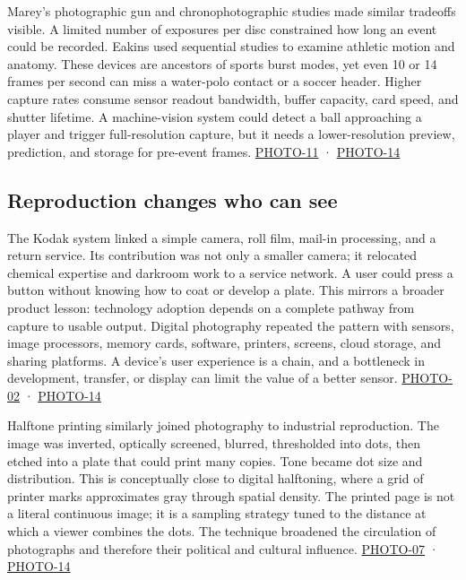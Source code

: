 Marey's photographic gun and chronophotographic studies made similar tradeoffs visible. A limited number of exposures per disc constrained how long an event could be recorded. Eakins used sequential studies to examine athletic motion and anatomy. These devices are ancestors of sports burst modes, yet even 10 or 14 frames per second can miss a water-polo contact or a soccer header. Higher capture rates consume sensor readout bandwidth, buffer capacity, card speed, and shutter lifetime. A machine-vision system could detect a ball approaching a player and trigger full-resolution capture, but it needs a lower-resolution preview, prediction, and storage for pre-event frames. \hyperref[04-visual-computing-ii-ch036-photo-11---photography-session-11]{PHOTO-11} · \hyperref[04-visual-computing-ii-ch036-photo-14---photography-session-14]{PHOTO-14}

\subsection{Reproduction changes who can see}\label{04-visual-computing-ii-ch034-reproduction-changes-who-can-see}

The Kodak system linked a simple camera, roll film, mail-in processing, and a return service. Its contribution was not only a smaller camera; it relocated chemical expertise and darkroom work to a service network. A user could press a button without knowing how to coat or develop a plate. This mirrors a broader product lesson: technology adoption depends on a complete pathway from capture to usable output. Digital photography repeated the pattern with sensors, image processors, memory cards, software, printers, screens, cloud storage, and sharing platforms. A device's user experience is a chain, and a bottleneck in development, transfer, or display can limit the value of a better sensor. \hyperref[04-visual-computing-ii-ch036-photo-02---photography-session-02]{PHOTO-02} · \hyperref[04-visual-computing-ii-ch036-photo-14---photography-session-14]{PHOTO-14}

Halftone printing similarly joined photography to industrial reproduction. The image was inverted, optically screened, blurred, thresholded into dots, then etched into a plate that could print many copies. Tone became dot size and distribution. This is conceptually close to digital halftoning, where a grid of printer marks approximates gray through spatial density. The printed page is not a literal continuous image; it is a sampling strategy tuned to the distance at which a viewer combines the dots. The technique broadened the circulation of photographs and therefore their political and cultural influence. \hyperref[04-visual-computing-ii-ch036-photo-07---photography-session-07]{PHOTO-07} · \hyperref[04-visual-computing-ii-ch036-photo-14---photography-session-14]{PHOTO-14}

